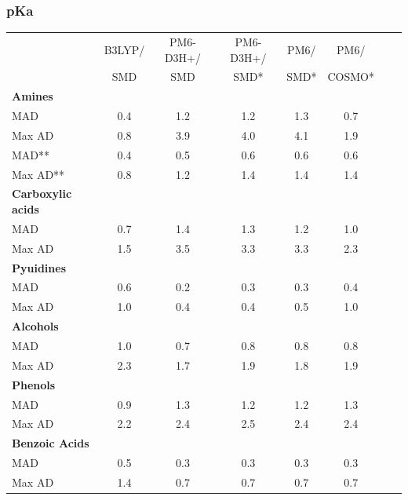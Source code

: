 \begin{frame}[fragile]
    \frametitle{pKa}

    \scriptsize
\begin{table}[htb]
\begin{tabular}{lccccccc}
\midrule
                  & B3LYP/& PM6-D3H+/ & PM6-D3H+/ & PM6/ & PM6/ \\
                  & SMD   & SMD       & SMD*      & SMD* & COSMO* \\
\midrule
\textbf{Amines}  &       &          &          &         &           \\
MAD              & 0.4   & 1.2      & 1.2      & 1.3     & 0.7       \\
Max AD           & 0.8   & 3.9      & 4.0      & 4.1     & 1.9       \\
MAD**            & 0.4   & 0.5      & 0.6      & 0.6     & 0.6       \\
Max AD**         & 0.8   & 1.2      & 1.4      & 1.4     & 1.4       \\
\textbf{Carboxylic acids}\\
MAD              & 0.7   & 1.4      & 1.3      & 1.2     & 1.0       \\
Max AD           & 1.5   & 3.5      & 3.3      & 3.3     & 2.3       \\
\textbf{Pyuidines}\\
MAD              & 0.6   & 0.2      & 0.3      & 0.3     & 0.4       \\
Max AD           & 1.0   & 0.4      & 0.4      & 0.5     & 1.0       \\
\textbf{Alcohols}\\
MAD              & 1.0   & 0.7      & 0.8      & 0.8     & 0.8       \\
Max AD           & 2.3   & 1.7      & 1.9      & 1.8     & 1.9       \\
\textbf{Phenols}\\
MAD              & 0.9   & 1.3      & 1.2      & 1.2     & 1.3       \\
Max AD           & 2.2   & 2.4      & 2.5      & 2.4     & 2.4       \\
\textbf{Benzoic Acids}\\
MAD              & 0.5   & 0.3      & 0.3      & 0.3     & 0.3       \\
Max AD           & 1.4   & 0.7      & 0.7      & 0.7     & 0.7  \\
\midrule
\end{tabular}
\end{table}




\end{frame}



